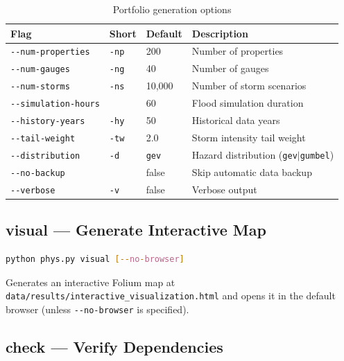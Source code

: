 \documentclass[11pt,a4paper]{article}
\begin{document}
\begin{table}[H]
    \centering
    \caption{Portfolio generation options}
    \label{tab:port_options}
    \begin{tabular}{@{}llll@{}}
        \toprule
        \textbf{Flag} & \textbf{Short} & \textbf{Default} & \textbf{Description} \\
        \midrule
        \texttt{-{}-num-properties} & \texttt{-np} & 200    & Number of properties \\
        \texttt{-{}-num-gauges}     & \texttt{-ng} & 40     & Number of gauges \\
        \texttt{-{}-num-storms}     & \texttt{-ns} & 10,000 & Number of storm scenarios \\
        \texttt{-{}-simulation-hours}&             & 60     & Flood simulation duration \\
        \texttt{-{}-history-years}  & \texttt{-hy} & 50     & Historical data years \\
        \texttt{-{}-tail-weight}    & \texttt{-tw} & 2.0    & Storm intensity tail weight \\
        \texttt{-{}-distribution}   & \texttt{-d}  & \texttt{gev} & Hazard distribution (\texttt{gev}$|$\texttt{gumbel}) \\
        \texttt{-{}-no-backup}      &              & false  & Skip automatic data backup \\
        \texttt{-{}-verbose}        & \texttt{-v}  & false  & Verbose output \\
        \bottomrule
    \end{tabular}
\end{table}

\subsection{visual --- Generate Interactive Map}

\begin{lstlisting}[language=bash]
python phys.py visual [--no-browser]
\end{lstlisting}

Generates an interactive Folium map at
\texttt{data/results/interactive\_visualization.html} and opens it in the
default browser (unless \texttt{-{}-no-browser} is specified).

\subsection{check --- Verify Dependencies}
\end{document}
